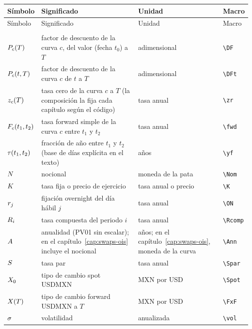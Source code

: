 {\small
\begin{longtable}{@{}>{\raggedright\arraybackslash}p{}>{\raggedright\arraybackslash}p{}>{\raggedright\arraybackslash}p{}>{\raggedright\arraybackslash}p{}@{}}
\toprule
Símbolo & Significado & Unidad & Macro \\
\midrule
\endfirsthead
\toprule
Símbolo & Significado & Unidad & Macro \\
\midrule
\endhead
\bottomrule
\endfoot
\multicolumn{4}{@{}l}{\textit{Símbolos comunes}} \\
\midrule
$P_{c}(T)$ & factor de descuento de la curva $c$, del valor (fecha $t_0$) a $T$ & adimensional & \texttt{\textbackslash{}DF} \\
$P_{c}(t,T)$ & factor de descuento de la curva $c$ de $t$ a $T$ & adimensional & \texttt{\textbackslash{}DFt} \\
$z_{c}(T)$ & tasa cero de la curva $c$ a $T$ (la composición la fija cada capítulo según el código) & tasa anual & \texttt{\textbackslash{}zr} \\
$F_{c}(t_1,t_2)$ & tasa forward simple de la curva $c$ entre $t_1$ y $t_2$ & tasa anual & \texttt{\textbackslash{}fwd} \\
$\tau(t_1,t_2)$ & fracción de año entre $t_1$ y $t_2$ (base de días explícita en el texto) & años & \texttt{\textbackslash{}yf} \\
$N$ & nocional & moneda de la pata & \texttt{\textbackslash{}Nom} \\
$K$ & tasa fija o precio de ejercicio & tasa anual o precio & \texttt{\textbackslash{}K} \\
$r_{j}$ & fijación overnight del día hábil $j$ & tasa anual & \texttt{\textbackslash{}ON} \\
$R_{i}$ & tasa compuesta del periodo $i$ & tasa anual & \texttt{\textbackslash{}Rcomp} \\
$A$ & anualidad (PV01 sin escalar); en el capítulo~\ref{cap:swaps-ois} incluye el nocional & años; en el capítulo~\ref{cap:swaps-ois}, moneda de la curva & \texttt{\textbackslash{}Ann} \\
$S$ & tasa par & tasa anual & \texttt{\textbackslash{}Spar} \\
$X_0$ & tipo de cambio spot USDMXN & MXN por USD & \texttt{\textbackslash{}Spot} \\
$X(T)$ & tipo de cambio forward USDMXN a $T$ & MXN por USD & \texttt{\textbackslash{}FxF} \\
$\sigma$ & volatilidad & anualizada & \texttt{\textbackslash{}vol} \\

\end{longtable}}
